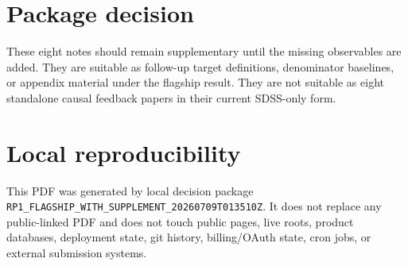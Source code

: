 \documentclass[twocolumn]{aastex631}
\begin{document}
\section{Package decision}
These eight notes should remain supplementary until the missing observables are added. They are suitable as follow-up target definitions, denominator baselines, or appendix material under the flagship result. They are not suitable as eight standalone causal feedback papers in their current SDSS-only form.

\section{Local reproducibility}
This PDF was generated by local decision package \texttt{RP1\_FLAGSHIP\_WITH\_SUPPLEMENT\_20260709T013510Z}. It does not replace any public-linked PDF and does not touch public pages, live roots, product databases, deployment state, git history, billing/OAuth state, cron jobs, or external submission systems.
\end{document}
